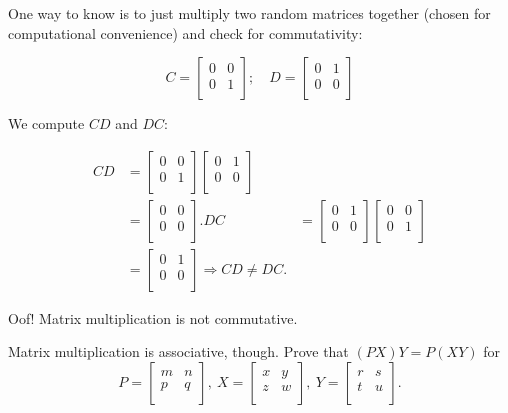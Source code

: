 \documentclass[../key.tex]{subfiles}
\begin{document}
One way to know is to just multiply two random matrices together (chosen for computational convenience) and check for commutativity:

$$C = \begin{bmatrix}
0 & 0 \\
0 & 1 \\
\end{bmatrix};\quad D = \begin{bmatrix}
0 & 1 \\
0 & 0 \\
\end{bmatrix}$$

We compute $CD$ and $DC$:

\begin{align*}
CD &= \begin{bmatrix}
0 & 0 \\
0 & 1 \\
\end{bmatrix}\begin{bmatrix}
0 & 1 \\
0 & 0 \\
\end{bmatrix} \\
&= \begin{bmatrix}
0 & 0 \\
0 & 0 \\
\end{bmatrix}.
DC &= \begin{bmatrix}
0 & 1 \\
0 & 0 \\
\end{bmatrix}\begin{bmatrix}
0 & 0 \\
0 & 1 \\
\end{bmatrix} \\
&= \begin{bmatrix}
0 & 1 \\
0 & 0 \\
\end{bmatrix}
\Longrightarrow CD \neq DC.
\end{align*}

Oof! Matrix multiplication is not commutative.

\begin{outer_problem}
\item Matrix multiplication is associative, though. Prove that $(PX)Y=P(XY)$ for $$P=\left[\begin{array}{cc} m & n \\ p & q \\ \end{array}\right],\: X=\left[\begin{array}{cc} x & y \\ z & w \\ \end{array}\right],\: Y=\left[\begin{array}{cc} r & s \\ t & u \\ \end{array}\right].$$
\end{outer_problem}
\end{document}

